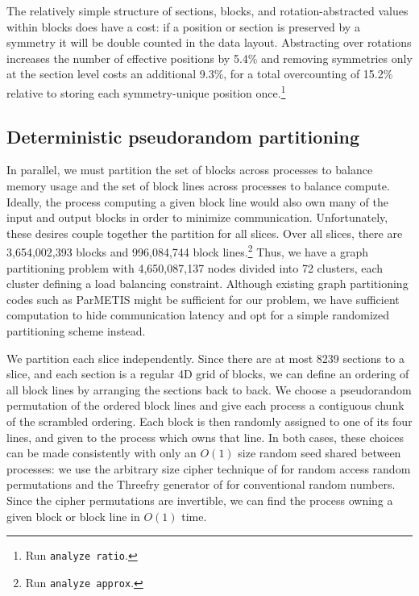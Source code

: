 \documentclass[conference]{IEEEtran}
\begin{document}
The relatively simple structure of sections, blocks, and rotation-abstracted values within blocks does have
a cost: if a position or section is preserved by a symmetry it will be double counted in the data layout.
Abstracting over rotations increases the number of effective positions by 5.4\% and removing symmetries only
at the section level costs an additional 9.3\%, for a total overcounting of 15.2\% relative to storing each
symmetry-unique position once.\cprotect\footnote{Run \verb+analyze ratio+.}

\subsection{Deterministic pseudorandom partitioning}

In parallel, we must partition the set of blocks across processes to balance memory usage and the
set of block lines across processes to balance compute.  Ideally, the process computing a given block line
would also own many of the input and output blocks in order to minimize communication.  Unfortunately, these
desires couple together the partition for all slices.  Over all slices, there are 3,654,002,393 blocks and
996,084,744 block lines.\cprotect\footnote{Run \verb+analyze approx+.}  Thus, we have a graph partitioning
problem with 4,650,087,137 nodes divided into 72 clusters, each cluster defining a load balancing constraint.
Although existing graph partitioning codes such as ParMETIS\cite{schloegel2002parmetis} might be sufficient
for our problem, we have sufficient computation to hide communication latency and opt for a
simple randomized partitioning scheme instead.

We partition each slice independently.  Since there are at most 8239 sections to a slice, and
each section is a regular 4D grid of blocks, we can define an ordering of all block lines
by arranging the sections back to back.  We choose a pseudorandom permutation of the ordered block
lines and give each process a contiguous chunk of the scrambled ordering.  Each block is then randomly
assigned to one of its four lines, and given to the process which owns that line.  In both cases, these choices
can be made consistently with only an $O(1)$ size random seed shared between processes: we use the arbitrary size
cipher technique of \cite{black2002ciphers} for random access random permutations and the Threefry generator
of \cite{salmon2011parallel} for conventional random numbers.  Since the cipher permutations are invertible,
we can find the process owning a given block or block line in $O(1)$ time.
\end{document}
